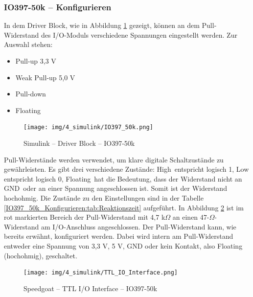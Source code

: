 \subsubsection{IO397-50k – Konfigurieren}
\label{Simulink:IO397_50k_Konfigurieren}

In dem Driver Block, wie in Abbildung \ref{IO397_50k_Konfigurieren:img:Driver_Block} gezeigt, können an dem Pull-Widerstand des I/O-Moduls verschiedene Spannungen eingestellt werden. Zur Auswahl stehen:\\
\begin{itemize}
	\item Pull-up 3,3 V
	\item Weak Pull-up 5,0 V
	\item Pull-down
	\item Floating
\end{itemize}

\pagebreak[1]
\begin{figure}[!ht]
	\begin{center}
		\texttt{[image: img/4\_simulink/IO397\_50k.png]}
		\caption{Simulink – Driver Block – IO397-50k}
		\label{IO397_50k_Konfigurieren:img:Driver_Block}
	\end{center}
\end{figure}
\pagebreak[1]

Pull-Widerstände werden verwendet, um klare digitale Schaltzustände zu gewährleisten. Es gibt drei verschiedene Zustände: \frqq High\flqq\ entspricht \frqq logisch 1\flqq, Low entspricht \frqq logisch 0\flqq, \frqq Floating\flqq\ hat die Bedeutung, dass der Widerstand nicht an \frqq GND\flqq\ oder an einer Spannung angeschlossen ist. Somit ist der Widerstand hochohmig. Die Zustände zu den Einstellungen sind in der Tabelle \ref{IO397_50k_Konfigurieren:tab:Reaktionszeit} aufgeführt.
In Abbildung \ref{IO397_50k_Konfigurieren:img:TTL_IO_Interface} ist im rot markierten Bereich der Pull-Widerstand mit 4,7 k$\Omega$ an einen 47-$\Omega$-Widerstand am I/O-Anschluss angeschlossen. Der Pull-Widerstand kann, wie bereits erwähnt, konfiguriert werden. Dabei wird intern am Pull-Widerstand entweder eine Spannung von 3,3 V, 5 V, GND oder kein Kontakt, also Floating (hochohmig), geschaltet.

\pagebreak[1]
\begin{figure}[!ht]
	\begin{center}
		\texttt{[image: img/4\_simulink/TTL\_IO\_Interface.png]}
		\caption{Speedgoat – TTL I/O Interface – IO397-50k \cite[12]{speedgoat:IO397_50k}}
		\label{IO397_50k_Konfigurieren:img:TTL_IO_Interface}
	\end{center}
\end{figure}
\pagebreak[2]



